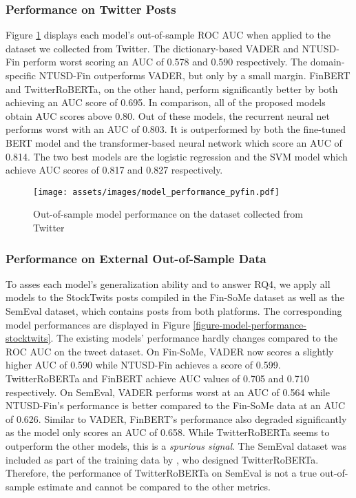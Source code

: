\subsubsection{Performance on Twitter Posts}
Figure \ref{figure-model-performance-twitter} displays each model's out-of-sample ROC AUC when applied to the dataset we collected from Twitter. The dictionary-based VADER and NTUSD-Fin perform worst scoring an AUC of 0.578 and 0.590 respectively. The domain-specific NTUSD-Fin outperforms VADER, but only by a small margin. FinBERT and TwitterRoBERTa, on the other hand, perform significantly better by both achieving an AUC score of 0.695.\newline
In comparison, all of the proposed models obtain AUC scores above 0.80. Out of these models, the recurrent neural net performs worst with an AUC of 0.803. It is outperformed by both the fine-tuned BERT model and the transformer-based neural network which score an AUC of 0.814. The two best models are the logistic regression and the SVM model which achieve AUC scores of 0.817 and 0.827 respectively.


\begin{figure}[!ht]
	\texttt{[image: assets/images/model\_performance\_pyfin.pdf]}	
	\caption{Out-of-sample model performance on the dataset collected from Twitter}
	\label{figure-model-performance-twitter}
\end{figure}



\subsubsection{Performance on External Out-of-Sample Data}
\label{section-modelperf-on-finsome}
To asses each model's generalization ability and to answer RQ4, we apply all models to the StockTwits posts compiled in the Fin-SoMe dataset as well as the SemEval dataset, which contains posts from both platforms. The corresponding model performances are displayed in Figure \ref{figure-model-performance-stocktwits}. The existing models' performance hardly changes compared to the ROC AUC on the tweet dataset.\newline
On Fin-SoMe, VADER now scores a slightly higher AUC of 0.590 while NTUSD-Fin achieves a score of 0.599. TwitterRoBERTa and FinBERT achieve AUC values of 0.705 and 0.710 respectively.\newline
On SemEval, VADER performs worst at an AUC of 0.564 while NTUSD-Fin's performance is better compared to the Fin-SoMe data at an AUC of 0.626. Similar to VADER, FinBERT's performance also degraded significantly as the model only scores an AUC of 0.658. While TwitterRoBERTa seems to outperform the other models, this is a \emph{spurious signal}. The SemEval dataset was included as part of the training data by , who designed TwitterRoBERTa. Therefore, the performance of TwitterRoBERTa on SemEval is not a true out-of-sample estimate and cannot be compared to the other metrics.

